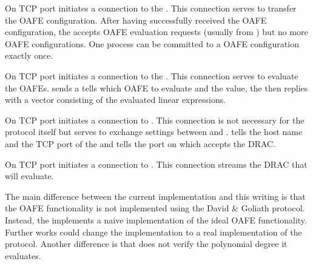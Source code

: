 %
%
\label{sec:communication-channels}


\label{sec:comm:goliath2Token}

On TCP port  \JWpOne{} initiates a connection to the \JWtoken{}.
This connection serves to transfer the OAFE configuration. After having
successfully received the OAFE configuration, the \JWtoken{} accepts OAFE
evaluation requests (usually from \JWpTwo{}) but no more OAFE configurations.
One \JWtoken{} process can be committed to a OAFE configuration exactly once.


\label{sec:comm:david2token}

On TCP port  \JWpTwo{} initiates a connection to the \JWtoken{}.
This connection serves to evaluate the OAFEs. \JWpTwo{} sends a tells which
OAFE to evaluate and the value, the \JWtoken{} then replies with a vector
consisting of the evaluated linear expressions.


\label{sec:comm:david2goliath}

On TCP port  \JWpTwo{} initiates a connection to \JWpOne{}. This
connection is not necessary for the protocol itself but serves to exchange
settings between \JWpOne{} and \JWpTwo{}. \JWpOne{} tells \JWpTwo{} the host
name and the TCP port of the \JWtoken{} and \JWpTwo{} tells \JWpOne{} the port
on which \JWpTwo{} accepts the DRAC.


\label{sec:comm:goliath2david}

On TCP port  \JWpOne{} initiates a connection to \JWpTwo{}. This
connection streams the DRAC that \JWpTwo{} will evaluate.


%
%
\label{sec:implementation-differences}

The main difference between the current implementation and this writing is that
the OAFE functionality is not implemented using the David \& Goliath
\cite{davidgoliath} protocol. Instead, the \JWBtoken{} implements a naive
implementation of the ideal OAFE functionality. Further works could change the
implementation to a real implementation of the protocol. Another difference is
that \JWpTwo{} does not verify the polynomial degree it evaluates.


